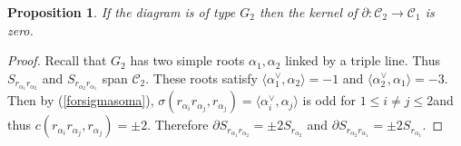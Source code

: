\documentclass[10pt,a4paper]{amsart}
\numberwithin{equation}{section}
\newtheorem{Proposition}[Theorem]{Proposition}
 { \theoremstyle{definition}
\newtheorem{Definition}[Theorem]{Definition}
\newtheorem{Note}[Theorem]{Note}
\newtheorem{Example}[Theorem]{Example}
\newtheorem{Remark}[Theorem]{Remark} }
\begin{document}
\begin{Proposition}\label{pro.kerg2}If the diagram is of type $G_{2}$ then the kernel of $\partial \colon \mathcal{C}_{2}\longrightarrow \mathcal{C}_{1}$ is zero.
\end{Proposition}

\begin{proof}Recall that $G_{2}$ has two simple roots $\alpha _{1},\alpha _{2}$ linked by a triple line. Thus $S_{r_{\alpha _{1}}r_{\alpha _{2}}}$ and $S_{r_{\alpha_{2}}r_{\alpha _{1}}}$ span $\mathcal{C}_{2}$. These roots satisfy $\langle \alpha _{1}^{\vee },\alpha _{2}\rangle =-1$ and $\langle \alpha _{2}^{\vee },\alpha _{1}\rangle =-3$. Then by (\ref{forsigmasoma}), $\sigma (r_{\alpha _{i}}r_{\alpha _{j}},r_{\alpha_{j}})=\langle \alpha _{i}^{\vee },\alpha _{j}\rangle $ is odd for $1\leq i\neq j\leq 2$and thus $c(r_{\alpha _{i}}r_{\alpha_{j}},r_{\alpha _{j}})=\pm 2$. Therefore $\partial S_{r_{\alpha _{1}}r_{\alpha _{2}}}=\pm 2S_{r_{\alpha _{2}}}$ and $\partial S_{r_{\alpha _{2}}r_{\alpha _{1}}}=\pm 2S_{r_{\alpha _{1}}}$.
\end{proof}
\end{document}
